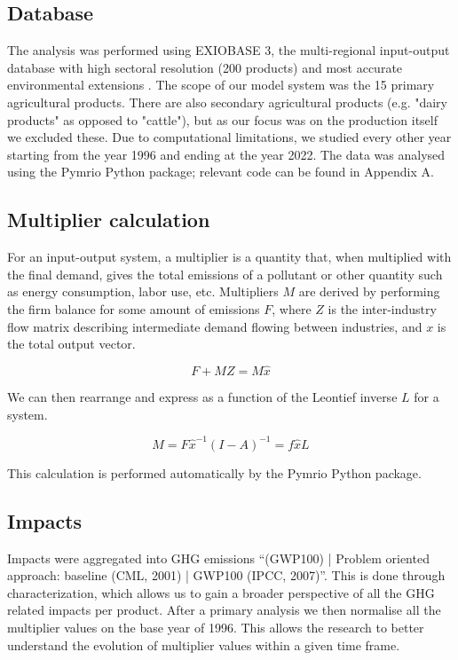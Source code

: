 \documentclass[a4paper,twoside]{article}
\begin{document}
\subsection{Database}

The analysis was performed using EXIOBASE 3, the multi-regional input-output database with high sectoral resolution (200 products) and most accurate environmental extensions \cite{Stadler2018}. The scope of our model system was the 15 primary agricultural products. There are also secondary agricultural products (e.g. "dairy products" as opposed to "cattle"), but as our focus was on the production itself we excluded these. Due to computational limitations, we studied every other year starting from the year 1996 and ending at the year 2022. The data was analysed using the Pymrio Python package; relevant code can be found in Appendix A.

\subsection{Multiplier calculation}

For an input-output system, a multiplier is a quantity that, when multiplied with the final demand, gives the total emissions of a pollutant or other quantity such as energy consumption, labor use, etc. Multipliers $M$ are derived by performing the firm balance for some amount of emissions $F$, where $Z$ is the inter-industry flow matrix describing intermediate demand flowing between industries, and $x$ is the total output vector.

\begin{equation}
F + M Z = M \hat{x}
\end{equation}

We can then rearrange and express as a function of the Leontief inverse $L$ for a system.

\begin{equation}
M = F \hat{x}^{-1} (I - A)^{-1} = f \hat{x} L
\end{equation}

This calculation is performed automatically by the Pymrio Python package.

\subsection{Impacts}

Impacts were aggregated into GHG emissions “(GWP100) | Problem oriented approach: baseline (CML, 2001) | GWP100 (IPCC, 2007)”. This is done through characterization, which allows us to gain a broader perspective of all the GHG related impacts per product. After a primary analysis we then normalise all the multiplier values on the base year of 1996. This allows the research to better understand the evolution of multiplier values within a given time frame.
\end{document}
